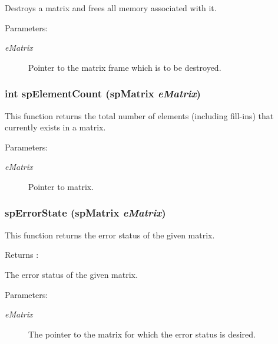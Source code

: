 Destroys a matrix and frees all memory associated with it.\begin{Desc}
\item[Parameters: ]\par
\begin{description}
\item[{\em 
e\-Matrix}]Pointer to the matrix frame which is to be destroyed. \end{description}
\end{Desc}
\subsubsection{\setlength{\rightskip}{0pt plus 5cm}int sp\-Element\-Count ({\bf sp\-Matrix} {\em e\-Matrix})}\label{spAllocate_8c_a21}


This function returns the total number of elements (including fill-ins) that currently exists in a matrix.\begin{Desc}
\item[Parameters: ]\par
\begin{description}
\item[{\em 
e\-Matrix}]Pointer to matrix. \end{description}
\end{Desc}
\subsubsection{ sp\-Error\-State ({\bf sp\-Matrix} {\em e\-Matrix})}\label{spAllocate_8c_a15}


This function returns the error status of the given matrix.

\begin{Desc}
\item[Returns :]\par
 The error status of the given matrix.\end{Desc}
\begin{Desc}
\item[Parameters: ]\par
\begin{description}
\item[{\em 
e\-Matrix}]The pointer to the matrix for which the error status is desired. \end{description}
\end{Desc}
